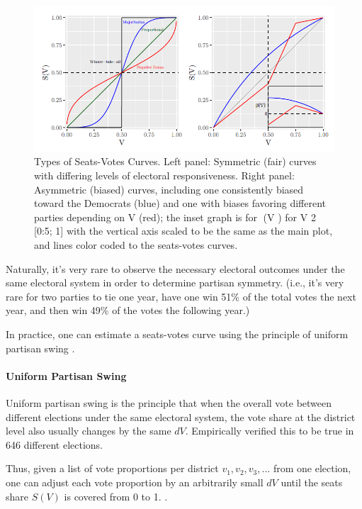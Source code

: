 \begin{figure}
    \includegraphics[width=0.8\linewidth]{img/seatsvotes.png}
    \caption{Types of Seats-Votes Curves. Left panel: Symmetric (fair) curves with differing
    levels of electoral responsiveness. Right panel: Asymmetric (biased) curves, including
    one consistently biased toward the Democrats (blue) and one with biases favoring different
    parties depending on V (red); the inset graph is for (V ) for V 2 [0:5; 1] with the vertical
    axis scaled to be the same as the main plot, and lines color coded to the seats-votes curves. \parencite[175]{katz2020}}
    \label{fig:seatsvotes1}
\end{figure}

Naturally, it's very rare to observe the necessary electoral outcomes under the same electoral system in order to determine partisan symmetry. (i.e., it's very rare for two parties to tie one year, have one win 51\% of the total votes the next year, and then win 49\% of the votes the following year.)

In practice, one can estimate a seats-votes curve using the principle of uniform partisan swing \parencite{tufte1973}.

\paragraph{Uniform Partisan Swing}

Uniform partisan swing is the principle that when the overall vote between different elections under the same electoral system, the vote share at the district level also usually changes by the same $dV$. \textcite{katz2020} Empirically verified this to be true in 646 different elections. 

Thus, given a list of vote proportions per district ${v_1, v_2, v_3, ...}$ from one election, one can adjust each vote proportion by an arbitrarily small $dV$ until the seats share $S(V)$ is covered from 0 to 1. \parencite{katz2020}.

